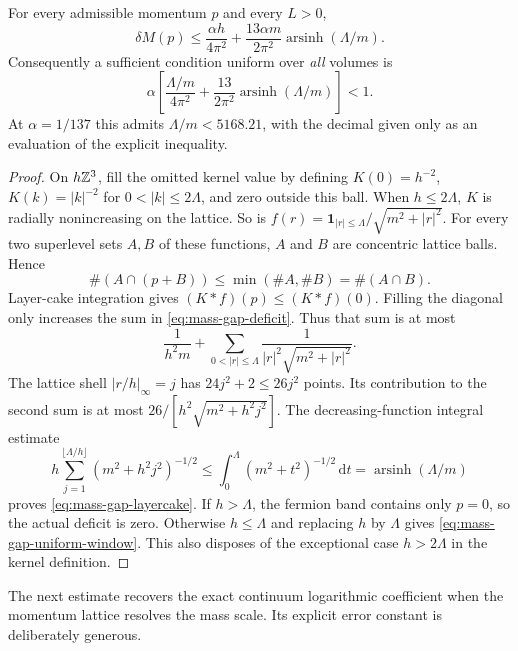 \begin{lemma}
\label{lem:mass-gap-layercake}
For every admissible momentum $p$ and every $L>0$,
\begin{equation}
 \delta M(p)\le \frac{\alpha h}{4\pi^2}
 +\frac{13\alpha m}{2\pi^2}\operatorname{arsinh}(\Lambda/m).
 \label{eq:mass-gap-layercake}
\end{equation}
Consequently a sufficient condition uniform over \emph{all} volumes is
\begin{equation}
 \alpha\left[\frac{\Lambda/m}{4\pi^2}
 +\frac{13}{2\pi^2}\operatorname{arsinh}(\Lambda/m)\right]<1.
 \label{eq:mass-gap-uniform-window}
\end{equation}
At $\alpha=1/137$ this admits $\Lambda/m<5168.21$, with the decimal
given only as an evaluation of the explicit inequality.
\end{lemma}
\begin{proof}
On $h\mathbb Z^3$, fill the omitted kernel value by defining $K(0)=h^{-2}$,
$K(k)=|k|^{-2}$ for $0<|k|\le2\Lambda$, and zero outside this ball.
When $h\le2\Lambda$, $K$ is radially nonincreasing on the lattice.
So is $f(r)=\mathbf1_{|r|\le\Lambda}/\sqrt{m^2+|r|^2}$.
For every two superlevel sets $A,B$ of these functions, $A$ and $B$ are
concentric lattice balls. Hence
\[
 \#(A\cap(p+B))\le\min(\#A,\#B)=\#(A\cap B).
\]
Layer-cake integration gives $(K*f)(p)\le(K*f)(0)$. Filling the diagonal
only increases the sum in \eqref{eq:mass-gap-deficit}. Thus that sum is
at most
\[
 \frac1{h^2m}+\sum_{0<|r|\le\Lambda}
 \frac1{|r|^2\sqrt{m^2+|r|^2}}.
\]
The lattice shell $|r/h|_\infty=j$ has $24j^2+2\le26j^2$ points.
Its contribution to the second sum is at most
$26/[h^2\sqrt{m^2+h^2j^2}]$. The decreasing-function integral estimate
\[
 h\sum_{j=1}^{\lfloor\Lambda/h\rfloor}
 (m^2+h^2j^2)^{-1/2}
 \le\int_0^\Lambda(m^2+t^2)^{-1/2}\,\mathrm dt
 =\operatorname{arsinh}(\Lambda/m)
\]
proves \eqref{eq:mass-gap-layercake}. If $h>\Lambda$, the fermion band
contains only $p=0$, so the actual deficit is zero. Otherwise $h\le\Lambda$
and replacing $h$ by $\Lambda$ gives \eqref{eq:mass-gap-uniform-window}.
This also disposes of the exceptional case $h>2\Lambda$ in the kernel
definition.
\end{proof}

The next estimate recovers the exact continuum logarithmic coefficient
when the momentum lattice resolves the mass scale. Its explicit error
constant is deliberately generous.

